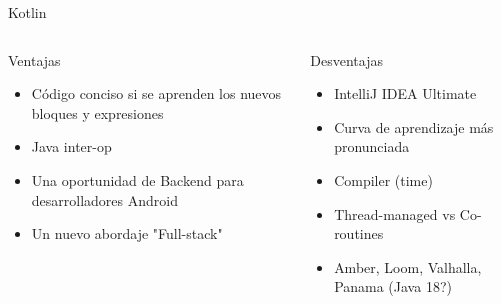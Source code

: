 \documentclass[aspectratio=169]{beamer}
\begin{document}
\begin{frame}{Kotlin}
\begin{columns}
	
	\begin{column}{0.5\textwidth}
		Ventajas
		\begin{itemize}
			\item Código conciso si se aprenden los nuevos bloques y expresiones
			\item Java inter-op
			\item Una oportunidad de Backend para desarrolladores Android
			\item Un nuevo abordaje "Full-stack"
		\end{itemize}
	\end{column}
	\begin{column}{0.5\textwidth}
		Desventajas 
		\begin{itemize}
			\item IntelliJ IDEA Ultimate
			\item Curva de aprendizaje más pronunciada
			\item Compiler (time)
			\item Thread-managed vs Co-routines
			\item Amber, Loom, Valhalla, Panama (Java 18?)
		\end{itemize}
	\end{column}
\end{columns}
\end{frame}
\end{document}
